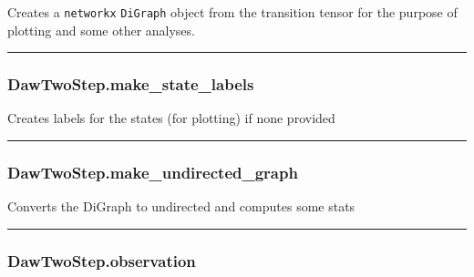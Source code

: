 Creates a \texttt{networkx} \texttt{DiGraph} object from the transition
tensor for the purpose of plotting and some other analyses.

\begin{center}\rule{0.5\linewidth}{\linethickness}\end{center}

\subsubsection{DawTwoStep.make\_state\_labels}\label{dawtwostep.make_state_labels}

\begin{Shaded}
\begin{Highlighting}[]
\NormalTok{)}
\end{Highlighting}
\end{Shaded}

Creates labels for the states (for plotting) if none provided

\begin{center}\rule{0.5\linewidth}{\linethickness}\end{center}

\subsubsection{DawTwoStep.make\_undirected\_graph}\label{dawtwostep.make_undirected_graph}

\begin{Shaded}
\begin{Highlighting}[]
\NormalTok{)}
\end{Highlighting}
\end{Shaded}

Converts the DiGraph to undirected and computes some stats

\begin{center}\rule{0.5\linewidth}{\linethickness}\end{center}

\subsubsection{DawTwoStep.observation}\label{dawtwostep.observation}

\begin{Shaded}
\begin{Highlighting}[]
\NormalTok{)}
\end{Highlighting}
\end{Shaded}

